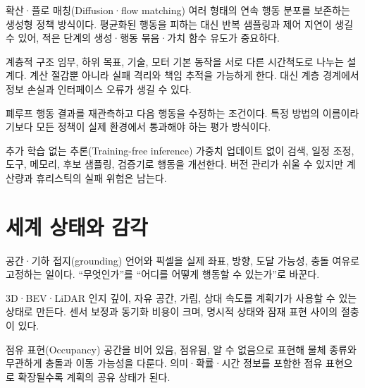 \documentclass[11pt,openany]{book}
\begin{document}
\begin{termcard}{확산·플로 매칭(Diffusion·flow matching)}
여러 형태의 연속 행동 분포를 보존하는 생성형 정책 방식이다. 평균화된 행동을 피하는 대신 반복 샘플링과 제어 지연이 생길 수 있어, 적은 단계의 생성·행동 묶음·가치 함수 유도가 중요하다.
\end{termcard}

\begin{termcard}{계층적 구조}
임무, 하위 목표, 기술, 모터 기본 동작을 서로 다른 시간척도로 나누는 설계다. 계산 절감뿐 아니라 실패 격리와 책임 추적을 가능하게 한다. 대신 계층 경계에서 정보 손실과 인터페이스 오류가 생길 수 있다.
\end{termcard}

\begin{termcard}{폐루프}
행동 결과를 재관측하고 다음 행동을 수정하는 조건이다. 특정 방법의 이름이라기보다 모든 정책이 실제 환경에서 통과해야 하는 평가 방식이다.
\end{termcard}

\begin{termcard}{추가 학습 없는 추론(Training-free inference)}
가중치 업데이트 없이 검색, 일정 조정, 도구, 메모리, 후보 샘플링, 검증기로 행동을 개선한다. 버전 관리가 쉬울 수 있지만 계산량과 휴리스틱의 실패 위험은 남는다.
\end{termcard}

\chapter*{세계 상태와 감각}

\begin{termcard}{공간·기하 접지(grounding)}
언어와 픽셀을 실제 좌표, 방향, 도달 가능성, 충돌 여유로 고정하는 일이다. ``무엇인가''를 ``어디를 어떻게 행동할 수 있는가''로 바꾼다.
\end{termcard}

\begin{termcard}{3D·BEV·LiDAR 인지}
깊이, 자유 공간, 가림, 상대 속도를 계획기가 사용할 수 있는 상태로 만든다. 센서 보정과 동기화 비용이 크며, 명시적 상태와 잠재 표현 사이의 절충이 있다.
\end{termcard}

\begin{termcard}{점유 표현(Occupancy)}
공간을 비어 있음, 점유됨, 알 수 없음으로 표현해 물체 종류와 무관하게 충돌과 이동 가능성을 다룬다. 의미·확률·시간 정보를 포함한 점유 표현으로 확장될수록 계획의 공유 상태가 된다.
\end{termcard}
\end{document}
